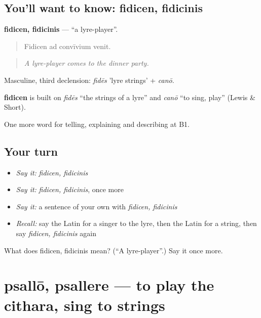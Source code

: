 \subsection*{You'll want to know: fidicen, fidicinis}
\textbf{fidicen, fidicinis} — \textquotedblleft{}a lyre-player\textquotedblright{}.

\begin{quote}
Fidicen ad convīvium venit.
\end{quote}

\begin{quote}
\emph{A lyre-player comes to the dinner party.}
\end{quote}

Masculine, third declension: \emph{fidēs} 'lyre strings' + \emph{canō}.

\begin{cousinweb}
\textbf{fidicen} is built on \emph{fidēs} \textquotedblleft{}the strings of a lyre\textquotedblright{} and \emph{canō} \textquotedblleft{}to sing, play\textquotedblright{} (Lewis \& Short).
\end{cousinweb}

\begin{grammarlens}[title={What you've built}]
One more word for telling, explaining and describing at B1.
\end{grammarlens}

\subsection*{Your turn}
\begin{itemize}
\raggedright
  \item \emph{Say it:} \emph{fidicen, fidicinis}
  \item \emph{Say it:} \emph{fidicen, fidicinis}, once more
  \item \emph{Say it:} a sentence of your own with \emph{fidicen, fidicinis}
  \item \emph{Recall:} say the Latin for a singer to the lyre, then the Latin for a string, then say \emph{fidicen, fidicinis} again
\end{itemize}

\begin{tcolorbox}[breakable,colback=teal!4,colframe=teal!35!black,title={Before you move on}]
What does fidicen, fidicinis mean? (\textquotedblleft{}A lyre-player\textquotedblright{}.) Say it once more.
\end{tcolorbox}
\section[psallō, psallere]{psallō, psallere — to play the cithara, sing to strings}


